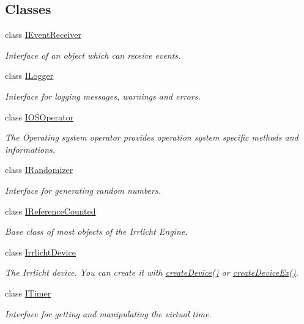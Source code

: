 \subsection*{Classes}
\begin{DoxyCompactItemize}
\item 
class \hyperlink{classirr_1_1IEventReceiver}{I\+Event\+Receiver}
\begin{DoxyCompactList}\small\item\em Interface of an object which can receive events. \end{DoxyCompactList}\item 
class \hyperlink{classirr_1_1ILogger}{I\+Logger}
\begin{DoxyCompactList}\small\item\em Interface for logging messages, warnings and errors. \end{DoxyCompactList}\item 
class \hyperlink{classirr_1_1IOSOperator}{I\+O\+S\+Operator}
\begin{DoxyCompactList}\small\item\em The Operating system operator provides operation system specific methods and informations. \end{DoxyCompactList}\item 
class \hyperlink{classirr_1_1IRandomizer}{I\+Randomizer}
\begin{DoxyCompactList}\small\item\em Interface for generating random numbers. \end{DoxyCompactList}\item 
class \hyperlink{classirr_1_1IReferenceCounted}{I\+Reference\+Counted}
\begin{DoxyCompactList}\small\item\em Base class of most objects of the Irrlicht Engine. \end{DoxyCompactList}\item 
class \hyperlink{classirr_1_1IrrlichtDevice}{Irrlicht\+Device}
\begin{DoxyCompactList}\small\item\em The Irrlicht device. You can create it with \hyperlink{namespaceirr_a57653fdaf6b2746b141ba2bb07d8bba6}{create\+Device()} or \hyperlink{namespaceirr_ae0a823eb5404bbf156965e7051798496}{create\+Device\+Ex()}. \end{DoxyCompactList}\item 
class \hyperlink{classirr_1_1ITimer}{I\+Timer}
\begin{DoxyCompactList}\small\item\em Interface for getting and manipulating the virtual time. \end{DoxyCompactList}\item 

\end{DoxyCompactItemize}
